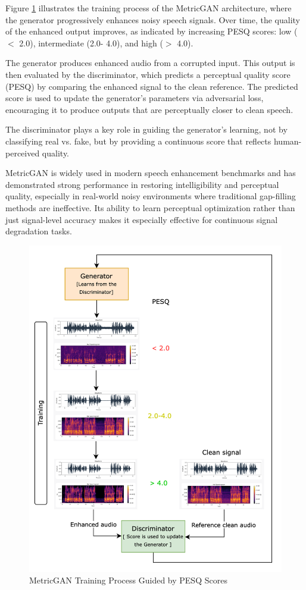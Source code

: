 Figure \ref{fig:figure6} illustrates the training process of the MetricGAN architecture, where the generator progressively enhances noisy speech signals. Over time, the quality of the enhanced output improves, as indicated by increasing PESQ scores: low (\(<\) 2.0), intermediate (2.0- 4.0), and high (\(>\) 4.0).

The generator produces enhanced audio from a corrupted input. This output is then evaluated by the discriminator, which predicts a perceptual quality score (PESQ) by comparing the enhanced signal to the clean reference. The predicted score is used to update the generator's parameters via adversarial loss, encouraging it to produce outputs that are perceptually closer to clean speech.

The discriminator plays a key role in guiding the generator’s learning, not by classifying real vs. fake, but by providing a continuous score that reflects human-perceived quality.


MetricGAN is widely used in modern speech enhancement benchmarks and has demonstrated strong performance in restoring intelligibility and perceptual quality, especially in real-world noisy environments where traditional gap-filling methods are ineffective. Its ability to learn perceptual optimization rather than just signal-level accuracy makes it especially effective for continuous signal degradation tasks.


\begin{figure}[H]
    \centering
    \includegraphics[width=.6\linewidth]{figures/gendis.png}
     \caption{MetricGAN Training Process Guided by PESQ Scores}
    \label{fig:figure6}
\end{figure}

